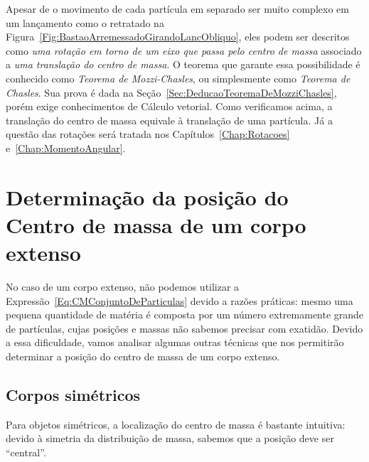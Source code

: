 Apesar de o movimento de cada partícula em separado ser muito complexo em um lançamento como o retratado na Figura~\ref{Fig:BastaoArremessadoGirandoLancObliquo}, eles podem ser descritos como \emph{uma rotação em torno de um eixo que passa pelo centro de massa} associado a \emph{uma translação do centro de massa}. O teorema que garante essa possibilidade é conhecido como \emph{Teorema de Mozzi-Chasles}, ou simplesmente como \emph{Teorema de Chasles}. Sua prova é dada na Seção~\ref{Sec:DeducaoTeoremaDeMozziChasles}, porém exige conhecimentos de Cálculo vetorial. Como verificamos acima, a translação do centro de massa equivale à translação de uma partícula. Já a questão das rotações será tratada nos Capítulos~\ref{Chap:Rotacoes} e~\ref{Chap:MomentoAngular}.

\section{Determinação da posição do Centro de massa de um corpo extenso}

No caso de um corpo extenso, não podemos utilizar a Expressão~\eqref{Eq:CMConjuntoDeParticulas} devido a razões práticas: mesmo uma pequena quantidade de matéria é composta por um número extremamente grande de partículas, cujas posições e massas não sabemos precisar com exatidão. Devido a essa dificuldade, vamos analisar algumas outras técnicas que nos permitirão determinar a posição do centro de massa de um corpo extenso.

\subsection{Corpos simétricos}

\begin{marginfigure}
\centering
{}
\caption{Para objetos simétricos, a localização do centro de massa é bastante intuitiva: devido à simetria da distribuição de massa, sabemos que a posição deve ser ``central''. \label{Fig:CMFigurasSimetricas}}
\end{marginfigure}

